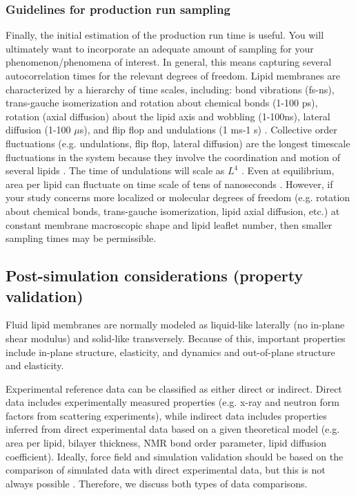 \documentclass[9pt,bestpractices]{livecoms}
\begin{document}
\subsubsection{Guidelines for production run sampling}
\label{subsubsec:prodrun}
Finally, the initial estimation of the production run time is useful.
You will ultimately want to incorporate an adequate amount of sampling for your phenomenon/phenomena of interest.
In general, this means capturing several autocorrelation times for the relevant degrees of freedom.
Lipid membranes are characterized by a hierarchy of time scales, including: bond vibrations (fs-ns), trans-gauche isomerization and rotation about chemical bonds (1-100 ps), rotation (axial diffusion) about the lipid axis and wobbling (1-100ns), lateral diffusion (1-100 $\mu$s), and flip flop and undulations (1 ms-1 s) \cite{Vermeer2007,Konig1996,Leftin2011}.
Collective order fluctuations (e.g. undulations, flip flop, lateral diffusion) are the longest timescale fluctuations in the system because they involve the coordination and motion of several lipids \cite{Vermeer2007}.
The time of undulations will scale as $L^4$ \cite{Watson2010a}.
Even at equilibrium, area per lipid can fluctuate on time scale of tens of nanoseconds \cite{Poger2016,Venable2015}.
However, if your study concerns more localized or molecular degrees of freedom (e.g. rotation about chemical bonds, trans-gauche isomerization, lipid axial diffusion, etc.) at constant membrane macroscopic shape and lipid leaflet number, then smaller sampling times may be permissible.

\subsection{Post-simulation considerations (property validation)}
\label{subsec:postsim3}
Fluid lipid membranes are normally modeled as liquid-like laterally (no in-plane shear modulus) and solid-like transversely.
Because of this, important properties include in-plane structure, elasticity, and dynamics and out-of-plane structure and elasticity.

Experimental reference data can be classified as either direct or indirect.
Direct data includes experimentally measured properties (e.g. x-ray and neutron form factors from scattering experiments), while indirect data includes properties inferred from direct experimental data based on a given theoretical model (e.g. area per lipid, bilayer thickness, NMR bond order parameter, lipid diffusion coefficient).
Ideally, force field and simulation validation should be based on the comparison of simulated data with direct experimental data, but this is not always possible \cite{Poger2016}.
Therefore, we discuss both types of data comparisons.
\end{document}
